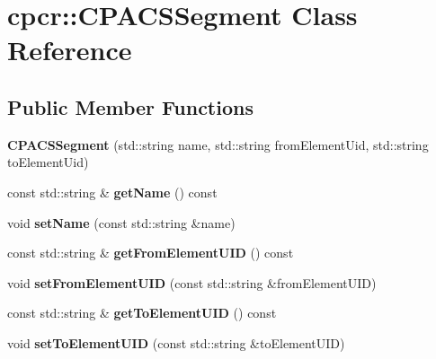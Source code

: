 \hypertarget{classcpcr_1_1CPACSSegment}{\section{cpcr\-:\-:C\-P\-A\-C\-S\-Segment Class Reference}
\label{classcpcr_1_1CPACSSegment}
}
\subsection*{Public Member Functions}
\begin{DoxyCompactItemize}
\item 
\hypertarget{classcpcr_1_1CPACSSegment_ae990cd6d42584d9d7ee45bb52e54bb82}{{\bfseries C\-P\-A\-C\-S\-Segment} (std\-::string name, std\-::string from\-Element\-Uid, std\-::string to\-Element\-Uid)}\label{classcpcr_1_1CPACSSegment_ae990cd6d42584d9d7ee45bb52e54bb82}

\item 
\hypertarget{classcpcr_1_1CPACSSegment_ad879cf3c2bd12e4b7c1b140ebf197b80}{const std\-::string \& {\bfseries get\-Name} () const }\label{classcpcr_1_1CPACSSegment_ad879cf3c2bd12e4b7c1b140ebf197b80}

\item 
\hypertarget{classcpcr_1_1CPACSSegment_afe9d3fb46d0f9f0a40ac08da44d86cb9}{void {\bfseries set\-Name} (const std\-::string \&name)}\label{classcpcr_1_1CPACSSegment_afe9d3fb46d0f9f0a40ac08da44d86cb9}

\item 
\hypertarget{classcpcr_1_1CPACSSegment_aa48f17781dc480bb338ba3c48f124ce3}{const std\-::string \& {\bfseries get\-From\-Element\-U\-I\-D} () const }\label{classcpcr_1_1CPACSSegment_aa48f17781dc480bb338ba3c48f124ce3}

\item 
\hypertarget{classcpcr_1_1CPACSSegment_a63df59b9ebebffcbbb4341eed29ade56}{void {\bfseries set\-From\-Element\-U\-I\-D} (const std\-::string \&from\-Element\-U\-I\-D)}\label{classcpcr_1_1CPACSSegment_a63df59b9ebebffcbbb4341eed29ade56}

\item 
\hypertarget{classcpcr_1_1CPACSSegment_a263ce407b9fce8407f6a67ba202f42b7}{const std\-::string \& {\bfseries get\-To\-Element\-U\-I\-D} () const }\label{classcpcr_1_1CPACSSegment_a263ce407b9fce8407f6a67ba202f42b7}

\item 
\hypertarget{classcpcr_1_1CPACSSegment_a047b4f53f4476d6ceb723081338f77b6}{void {\bfseries set\-To\-Element\-U\-I\-D} (const std\-::string \&to\-Element\-U\-I\-D)}\label{classcpcr_1_1CPACSSegment_a047b4f53f4476d6ceb723081338f77b6}

\end{DoxyCompactItemize}


